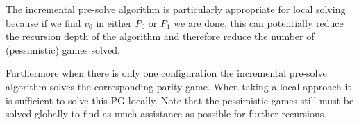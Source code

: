 The incremental pre-solve algorithm is particularly appropriate for local solving because if we find $v_0$ in either $P_0$ or $P_1$ we are done, this can potentially reduce the recursion depth of the algorithm and therefore reduce the number of (pessimistic) games solved.

Furthermore when there is only one configuration the incremental pre-solve algorithm solves the corresponding parity game. When taking a local approach it is sufficient to solve this PG locally. Note that the pessimistic games still must be solved globally to find as much assistance as possible for further recursions.